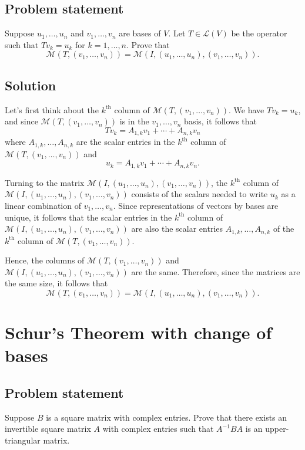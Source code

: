 \documentclass{article}
\begin{document}
\subsection*{Problem statement}
Suppose $u_1,\ldots,u_n$ and $v_1,\ldots,v_n$ are bases of $V$. 
Let $T\in\mathcal{L}(V)$ be the operator such that $Tv_k=u_k$ for $k=1,\ldots,n$. 
Prove that
\[\mathcal{M}(T,(v_1,\ldots,v_n))=\mathcal{M}(I,(u_1,\ldots,u_n),(v_1,\ldots,v_n)).\]

\subsection*{Solution}
Let's first think about the $k^{\text{th}}$ column of $\mathcal{M}(T,(v_1,\ldots,v_n))$. 
We have $Tv_k=u_k$, and since $\mathcal{M}(T,(v_1,\ldots,v_n))$ is in the $v_1,\ldots,v_n$ basis, it follows that
\[Tv_k=A_{1,k}v_1+\cdots+A_{n,k}v_n\]
where $A_{1,k},\ldots,A_{n,k}$ are the scalar entries in the $k^{\text{th}}$ column of $\mathcal{M}(T,(v_1,\ldots,v_n))$ and 
\[u_k=A_{1,k}v_1+\cdots+A_{n,k}v_n.\]

Turning to the matrix $\mathcal{M}(I,(u_1,\ldots,u_n),(v_1,\ldots,v_n))$, the $k^{\text{th}}$ column of $\mathcal{M}(I,(u_1,\ldots,u_n),(v_1,\ldots,v_n))$ consists of the scalars needed to write $u_k$ as a linear combination of $v_1,\ldots,v_n$. 
Since representations of vectors by bases are unique, it follows that the scalar entries in the $k^{\text{th}}$ column of \newline
$\mathcal{M}(I,(u_1,\ldots,u_n),(v_1,\ldots,v_n))$ are also the scalar entries $A_{1,k},\ldots,A_{n,k}$ of the $k^{\text{th}}$ column of $\mathcal{M}(T,(v_1,\ldots,v_n))$.

Hence, the columns of $\mathcal{M}(T,(v_1,\ldots,v_n))$ and \newline
$\mathcal{M}(I,(u_1,\ldots,u_n),(v_1,\ldots,v_n))$ are the same. 
Therefore, since the matrices are the same size, it follows that
\[\mathcal{M}(T,(v_1,\ldots,v_n))=\mathcal{M}(I,(u_1,\ldots,u_n),(v_1,\ldots,v_n)).\]

\clearpage

\section{Schur's Theorem with change of bases}
\subsection*{Problem statement}
Suppose $B$ is a square matrix with complex entries. 
Prove that there exists an invertible square matrix $A$ with complex entries such that $A^{-1}BA$ is an upper-triangular matrix.
\end{document}
